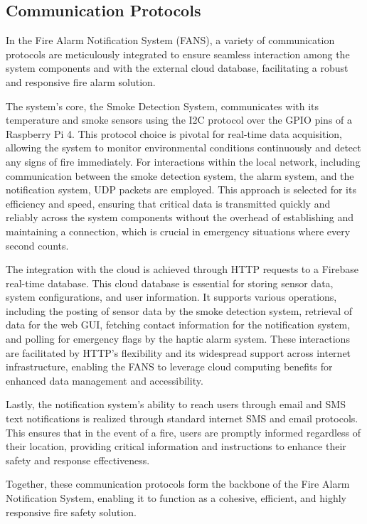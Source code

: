 \subsection{Communication Protocols}

In the Fire Alarm Notification System (FANS), a variety of communication protocols are meticulously integrated to
ensure seamless interaction among the system components and with the external cloud database, facilitating a robust and
responsive fire alarm solution.

The system's core, the Smoke Detection System, communicates with its temperature and smoke sensors using the I2C
protocol over the GPIO pins of a Raspberry Pi 4. This protocol choice is pivotal for real-time data acquisition,
allowing the system to monitor environmental conditions continuously and detect any signs of fire immediately. For
interactions within the local network, including communication between the smoke detection system, the alarm system,
and the notification system, UDP packets are employed. This approach is selected for its efficiency and speed, ensuring
that critical data is transmitted quickly and reliably across the system components without the overhead of
establishing and maintaining a connection, which is crucial in emergency situations where every second counts.

The integration with the cloud is achieved through HTTP requests to a Firebase real-time database. This cloud database
is essential for storing sensor data, system configurations, and user information. It supports various operations,
including the posting of sensor data by the smoke detection system, retrieval of data for the web GUI, fetching contact
information for the notification system, and polling for emergency flags by the haptic alarm system. These interactions
are facilitated by HTTP's flexibility and its widespread support across internet infrastructure, enabling the FANS to
leverage cloud computing benefits for enhanced data management and accessibility.

Lastly, the notification system's ability to reach users through email and SMS text notifications is realized through
standard internet SMS and email protocols. This ensures that in the event of a fire, users are promptly informed
regardless of their location, providing critical information and instructions to enhance their safety and response
effectiveness.

Together, these communication protocols form the backbone of the Fire Alarm Notification System, enabling it to
function as a cohesive, efficient, and highly responsive fire safety solution.

